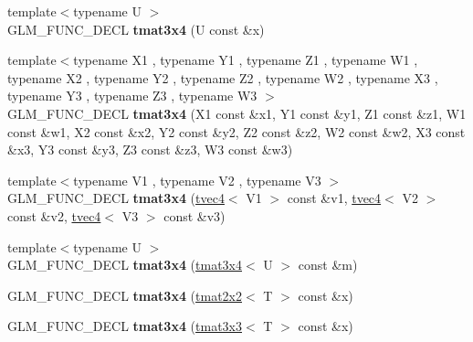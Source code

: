 \begin{DoxyCompactItemize}
\item 
\hypertarget{structglm_1_1detail_1_1tmat3x4_a8646de527d6da9c9c6677f63fee87a5a}{}{\footnotesize template$<$typename U $>$ }\\G\+L\+M\+\_\+\+F\+U\+N\+C\+\_\+\+D\+E\+C\+L {\bfseries tmat3x4} (U const \&x)\label{structglm_1_1detail_1_1tmat3x4_a8646de527d6da9c9c6677f63fee87a5a}

\item 
\hypertarget{structglm_1_1detail_1_1tmat3x4_a79731d96e3616675c81636a16ddffa38}{}{\footnotesize template$<$typename X1 , typename Y1 , typename Z1 , typename W1 , typename X2 , typename Y2 , typename Z2 , typename W2 , typename X3 , typename Y3 , typename Z3 , typename W3 $>$ }\\G\+L\+M\+\_\+\+F\+U\+N\+C\+\_\+\+D\+E\+C\+L {\bfseries tmat3x4} (X1 const \&x1, Y1 const \&y1, Z1 const \&z1, W1 const \&w1, X2 const \&x2, Y2 const \&y2, Z2 const \&z2, W2 const \&w2, X3 const \&x3, Y3 const \&y3, Z3 const \&z3, W3 const \&w3)\label{structglm_1_1detail_1_1tmat3x4_a79731d96e3616675c81636a16ddffa38}

\item 
\hypertarget{structglm_1_1detail_1_1tmat3x4_a6c89bd96cf630d7f6053e2239ddf240d}{}{\footnotesize template$<$typename V1 , typename V2 , typename V3 $>$ }\\G\+L\+M\+\_\+\+F\+U\+N\+C\+\_\+\+D\+E\+C\+L {\bfseries tmat3x4} (\hyperlink{structglm_1_1detail_1_1tvec4}{tvec4}$<$ V1 $>$ const \&v1, \hyperlink{structglm_1_1detail_1_1tvec4}{tvec4}$<$ V2 $>$ const \&v2, \hyperlink{structglm_1_1detail_1_1tvec4}{tvec4}$<$ V3 $>$ const \&v3)\label{structglm_1_1detail_1_1tmat3x4_a6c89bd96cf630d7f6053e2239ddf240d}

\item 
\hypertarget{structglm_1_1detail_1_1tmat3x4_a0889fe0c89c149b320bf3b40393e20b5}{}{\footnotesize template$<$typename U $>$ }\\G\+L\+M\+\_\+\+F\+U\+N\+C\+\_\+\+D\+E\+C\+L {\bfseries tmat3x4} (\hyperlink{structglm_1_1detail_1_1tmat3x4}{tmat3x4}$<$ U $>$ const \&m)\label{structglm_1_1detail_1_1tmat3x4_a0889fe0c89c149b320bf3b40393e20b5}

\item 
\hypertarget{structglm_1_1detail_1_1tmat3x4_a3488e8e002728294342554bfc8ce9427}{}G\+L\+M\+\_\+\+F\+U\+N\+C\+\_\+\+D\+E\+C\+L {\bfseries tmat3x4} (\hyperlink{structglm_1_1detail_1_1tmat2x2}{tmat2x2}$<$ T $>$ const \&x)\label{structglm_1_1detail_1_1tmat3x4_a3488e8e002728294342554bfc8ce9427}

\item 
\hypertarget{structglm_1_1detail_1_1tmat3x4_ae4cdbc4c75ed8fa4bc5b8f1c76f914a7}{}G\+L\+M\+\_\+\+F\+U\+N\+C\+\_\+\+D\+E\+C\+L {\bfseries tmat3x4} (\hyperlink{structglm_1_1detail_1_1tmat3x3}{tmat3x3}$<$ T $>$ const \&x)\label{structglm_1_1detail_1_1tmat3x4_ae4cdbc4c75ed8fa4bc5b8f1c76f914a7}


\end{DoxyCompactItemize}
